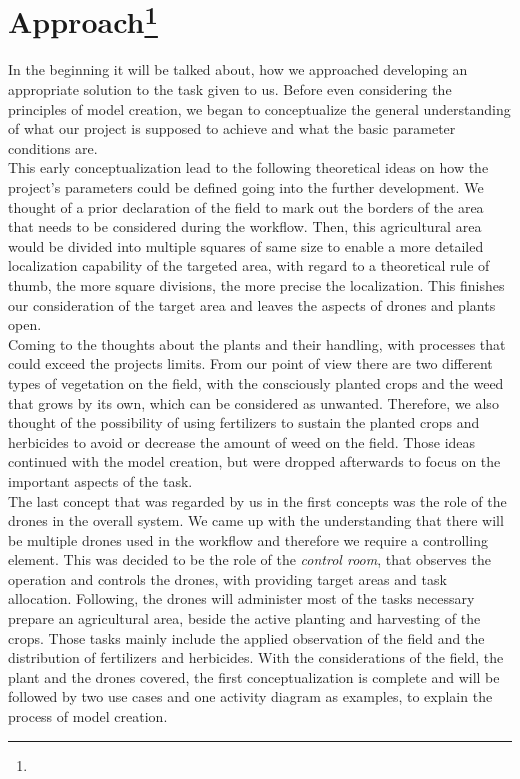 \documentclass[english]{lni}
\begin{document}
\section[Approach]{Approach\protect\footnote{ }}\label{sec:approach}

In the beginning it will be talked about, how we approached developing an appropriate solution to the task given to us. Before even considering the principles of model creation, we began to conceptualize the general understanding of what our project is supposed to achieve and what the basic parameter conditions are.\\
This early conceptualization lead to the following theoretical ideas on how the project's parameters could be defined going into the further development. We thought of a prior declaration of the field to mark out the borders of the area that needs to be considered during the workflow. Then, this agricultural area would be divided into multiple squares of same size to enable a more detailed localization capability of the targeted area, with regard to a theoretical rule of thumb, the more square divisions, the more precise the localization. This finishes our consideration of the target area and leaves the aspects of drones and plants open.\\
Coming to the thoughts about the plants and their handling, with processes that could exceed the projects limits. From our point of view there are two different types of vegetation on the field, with the consciously planted crops and the weed that grows by its own, which can be considered as unwanted. Therefore, we also thought of the possibility of using fertilizers to sustain the planted crops and herbicides to avoid or decrease the amount of weed on the field. Those ideas continued with the model creation, but were dropped afterwards to focus on the important aspects of the task.\\
The last concept that was regarded by us in the first concepts was the role of the drones in the overall system. We came up with the understanding that there will be multiple drones used in the workflow and therefore we require a controlling element. This was decided to be the role of the \textit{control room}, that observes the operation and controls the drones, with providing target areas and task allocation. Following, the drones will administer most of the tasks necessary prepare an agricultural area, beside the active planting and harvesting of the crops. Those tasks mainly include the applied observation of the field and the distribution of fertilizers and herbicides. With the considerations of the field, the plant and the drones covered, the first conceptualization is complete and will be followed by two use cases and one activity diagram as examples, to explain the process of model creation.
\end{document}
